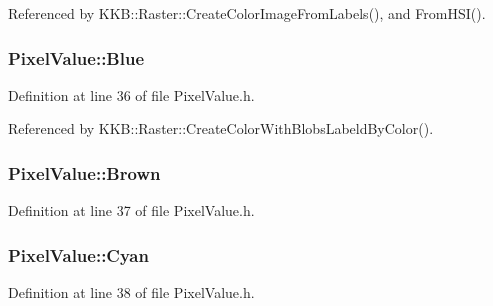 Referenced by K\+K\+B\+::\+Raster\+::\+Create\+Color\+Image\+From\+Labels(), and From\+H\+S\+I().

\subsubsection[{\texorpdfstring{Blue}{Blue}}]{ Pixel\+Value\+::\+Blue\hspace{0.3cm}{\ttfamily [static]}}\hypertarget{class_k_k_b_1_1_pixel_value_a95467b558e03495bcedbbcb3b000cfd2}{}\label{class_k_k_b_1_1_pixel_value_a95467b558e03495bcedbbcb3b000cfd2}


Definition at line 36 of file Pixel\+Value.\+h.



Referenced by K\+K\+B\+::\+Raster\+::\+Create\+Color\+With\+Blobs\+Labeld\+By\+Color().

\subsubsection[{\texorpdfstring{Brown}{Brown}}]{ Pixel\+Value\+::\+Brown\hspace{0.3cm}{\ttfamily [static]}}\hypertarget{class_k_k_b_1_1_pixel_value_aa9a5b8bef81ff8c7c88d6d5af5fd7761}{}\label{class_k_k_b_1_1_pixel_value_aa9a5b8bef81ff8c7c88d6d5af5fd7761}


Definition at line 37 of file Pixel\+Value.\+h.

\subsubsection[{\texorpdfstring{Cyan}{Cyan}}]{ Pixel\+Value\+::\+Cyan\hspace{0.3cm}{\ttfamily [static]}}\hypertarget{class_k_k_b_1_1_pixel_value_ac5a75718582075ab569462dddf7b8deb}{}\label{class_k_k_b_1_1_pixel_value_ac5a75718582075ab569462dddf7b8deb}


Definition at line 38 of file Pixel\+Value.\+h.

